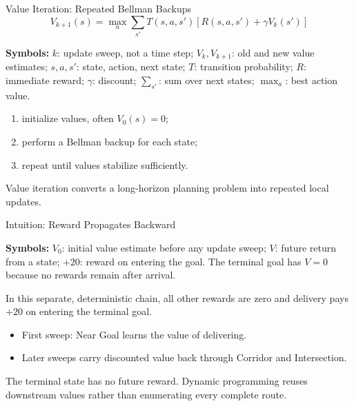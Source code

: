 \documentclass[aspectratio=169,10pt]{beamer}
\newcommand{\equationlegend}[1]{%
  \par\smallskip
  \begingroup
    \setlength{\fboxsep}{4pt}%
    \noindent\colorbox{DeckSoft}{%
      \parbox{\dimexpr\linewidth-2\fboxsep\relax}{%
        \footnotesize\textbf{Symbols:} #1%
      }%
    }\par
  \endgroup
  \smallskip
}
\begin{document}
\begin{frame}[shrink=10]{Value Iteration: Repeated Bellman Backups}
  \[
    V_{k+1}(s)=\max_a\sum_{s'}T(s,a,s')
    \left[R(s,a,s')+\gamma V_k(s')\right]
  \]
  \equationlegend{$k$: update sweep, not a time step; $V_k,V_{k+1}$: old and new value estimates; $s,a,s'$: state, action, next state; $T$: transition probability; $R$: immediate reward; $\gamma$: discount; $\sum_{s'}$: sum over next states; $\max_a$: best action value.}

  \begin{enumerate}
    \item initialize values, often $V_0(s)=0$;
    \item perform a Bellman backup for each state;
    \item repeat until values stabilize sufficiently.
  \end{enumerate}

  \begin{keyidea}
    Value iteration converts a long-horizon planning problem into repeated local updates.
  \end{keyidea}
\end{frame}

\begin{frame}{Intuition: Reward Propagates Backward}
  \begin{center}
  \end{center}
  \equationlegend{$V_0$: initial value estimate before any update sweep; $V$: future return from a state; $+20$: reward on entering the goal. The terminal goal has $V=0$ because no rewards remain after arrival.}

  In this separate, deterministic chain, all other rewards are zero and delivery pays $+20$ on entering the terminal goal.
  \begin{itemize}
    \item First sweep: Near Goal learns the value of delivering.
    \item Later sweeps carry discounted value back through Corridor and Intersection.
  \end{itemize}
  \begin{keyidea}
    The terminal state has no future reward. Dynamic programming reuses downstream values rather than enumerating every complete route.
  \end{keyidea}
\end{frame}
\end{document}
